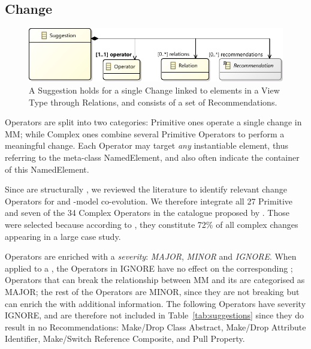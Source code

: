 \subsection{Change}
\label{sec:Suggestion:Change}

\begin{figure}[t]
    \centering
    \includegraphics[width=\columnwidth]{images/Suggestion.pdf}
    \caption{A \textsf{Suggestion} holds for a single \textsf{Change} linked to 
		elements in a View Type through \textsf{Relation}s, and consists of a set of \textsf{Recommendation}s.}
    \label{fig:Suggestion}
\end{figure}

\textsf{Operator}s are split into two categories:
\textsf{Primitive} ones operate a single change in \textsf{MM}; while
\textsf{Complex} ones combine several \textsf{Primitive} \textsf{Operator}s
to perform a meaningful change. 
Each \textsf{Operator} may target \emph{any} instantiable \metamodel element, 
thus referring to the meta-class \textsf{NamedElement}, and also often
indicate the \textsf{container} of this \textsf{NamedElement}.

Since \viewtypes are structurally \metamodels, we reviewed the literature to
identify relevant change \textsf{Operator}s for \metamodels and 
\metamodel{}-model co-evolution. 
We therefore integrate all 27 \textsf{Primitive} and seven of the 34 
\textsf{Complex} \textsf{Operator}s in the catalogue proposed by 
\textcite{herrmannsdoerfer_extensive_2011}.
Those were selected because according to \textcite{khelladi_detecting_2015}, 
they constitute 72\% of all complex changes appearing in a large case study. 

\textsf{Operator}s are enriched with a \emph{severity}: \emph{MAJOR}, 
\emph{MINOR} and \emph{IGNORE}. 
When applied to a \metamodel, the \textsf{Operator}s in \textsf{IGNORE} have no 
effect on the corresponding \viewtypes; \textsf{Operator}s that can break the 
relationship between \textsf{MM} and its \viewtypes are categorised as \textsf{MAJOR}; 
the rest of the \textsf{Operator}s are \textsf{MINOR}, since they are not 
breaking but can enrich the \viewtypes with additional information.
The following \textsf{Operator}s have severity \textsf{IGNORE}, and are 
therefore not included in Table~\ref{tab:suggestions} since they do result
in no \textsf{Recommendation}s: \textsf{Make/Drop Class Abstract}, 
\textsf{Make/Drop Attribute Identifier}, \textsf{Make/Switch Reference Composite},
and \textsf{Pull Property}.

